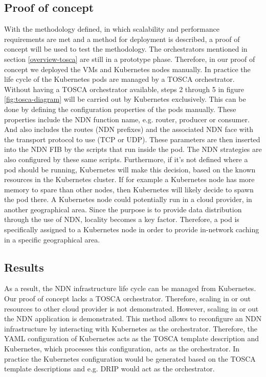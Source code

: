 \subsection{Proof of concept}
\label{planning-poc}
With the methodology defined, in which scalability and performance requirements are met and a method for deployment is described, a proof of concept will be used to test the methodology. The orchestrators mentioned in section \ref{overview-tosca} are still in a prototype phase. Therefore, in our proof of concept we deployed the VMs and Kubernetes nodes manually. In practice the life cycle of the Kubernetes pods are managed by a TOSCA orchestrator. Without having a TOSCA orchestrator available, steps 2 through 5 in figure \ref{fig:tosca-diagram} will be carried out by Kubernetes exclusively. This can be done by defining the configuration properties of the pods manually. These properties include the NDN function name, e.g. router, producer or consumer. And also includes the routes (NDN prefixes) and the associated NDN face with the transport protocol to use (TCP or UDP). These parameters are then inserted into the NDN FIB by the scripts that run inside the pod. The NDN strategies are also configured by these same scripts. Furthermore, if it's not defined where a pod should be running, Kubernetes will make this decision, based on the known resources in the Kubernetes cluster. If for example a Kubernetes node has more memory to spare than other nodes, then Kubernetes will likely decide to spawn the pod there. A Kubernetes node could potentially run in a cloud provider, in another geographical area. Since the purpose is to provide data distribution through the use of NDN, locality becomes a key factor. Therefore, a pod is specifically assigned to a Kubernetes node in order to provide in-network caching in a specific geographical area.


\subsection{Results}
As a result, the NDN infrastructure life cycle can be managed from Kubernetes. Our proof of concept lacks a TOSCA orchestrator. Therefore, scaling in or out resources to other cloud provider is not demonstrated. However, scaling in or out the NDN application is demonstrated. This method allows to reconfigure an NDN infrastructure by interacting with Kubernetes as the orchestrator. Therefore, the YAML configuration of Kubernetes acts as the TOSCA template description and Kubernetes, which processes this configuration, acts as the orchestrator. In practice the Kubernetes configuration would be generated based on the TOSCA template descriptions and e.g. DRIP would act as the orchestrator.

